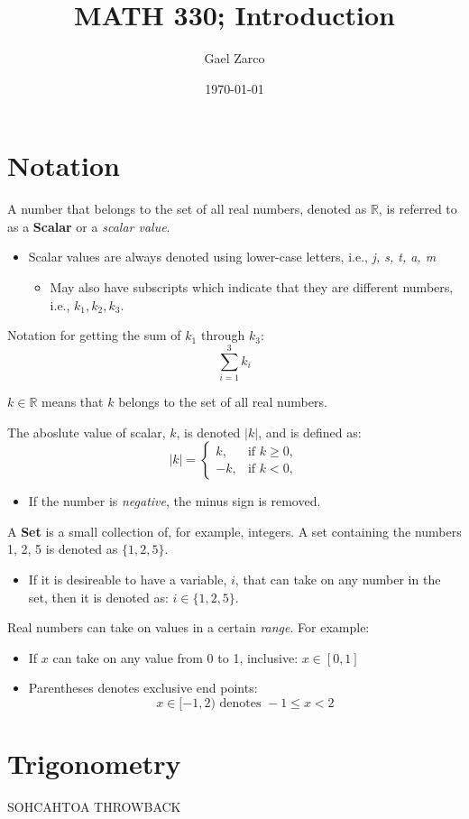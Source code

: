 \documentclass{article}
\title{MATH 330; Introduction}
\author{Gael Zarco}
\date{\today}
\begin{document}
\maketitle

\section{Notation} 
A number that belongs to the set of all real numbers, denoted as $\mathbb{R}$,
is referred to as a \textbf{Scalar} or a \textit{scalar value}.
\begin{itemize}
  \item Scalar values are always denoted using lower-case letters, i.e.,
  \textit{j, s, t, a, m}
    \begin{itemize}
      \item May also have subscripts which indicate that they are different
      numbers, i.e., \textit{$k_1, k_2, k_3$}.
    \end{itemize}
\end{itemize}

Notation for getting the sum of $k_1$ through $k_3$:
$$
  \sum_{i=1}^{3} k_i 
$$

$k \in \mathbb{R}$ means that $k$ belongs to the set of all real numbers.

\vspace{8pt}

The aboslute value of scalar, $k$, is denoted $|k|$, and is defined as:
$$
  |k| =
  \begin{cases}
    k,  & \text{if } k \ge 0,\\
    -k, & \text{if } k < 0,
  \end{cases}
$$
\begin{itemize}
  \item If the number is \textit{negative}, the minus sign is removed.
\end{itemize}

A \textbf{Set} is a small collection of, for example, integers. A set
containing the numbers 1, 2, 5 is denoted as $\{1, 2, 5\}$.
\begin{itemize}
  \item If it is desireable to have a variable, $i$, that can take on any number
    in the set, then it is denoted as: $ i \in \{1, 2, 5\}$.
\end{itemize}

Real numbers can take on values in a certain \textit{range}. For example:
\begin{itemize}
  \item If $x$ can take on any value from 0 to 1, inclusive: $ x \in [0, 1]$
  \item Parentheses denotes exclusive end points:
  $$
    x \in [-1, 2) \text{ denotes } -1 \le x < 2
  $$
\end{itemize}

\section{Trigonometry} 
SOHCAHTOA THROWBACK
\end{document}
